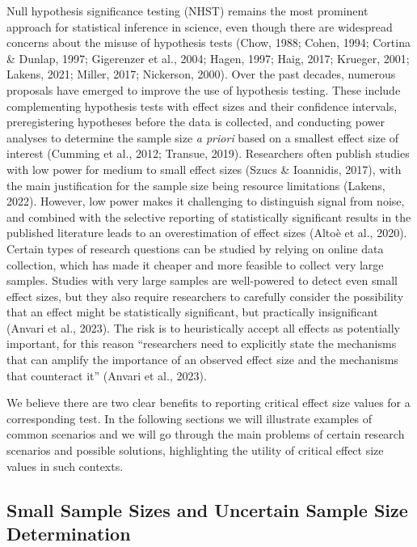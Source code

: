\documentclass[
  man,floatsintext]{apa7}
\begin{document}
Null hypothesis significance testing (NHST) remains the most prominent approach for statistical inference in science, even though there are widespread concerns about the misuse of hypothesis tests (Chow, 1988; Cohen, 1994; Cortina \& Dunlap, 1997; Gigerenzer et al., 2004; Hagen, 1997; Haig, 2017; Krueger, 2001; Lakens, 2021; Miller, 2017; Nickerson, 2000). Over the past decades, numerous proposals have emerged to improve the use of hypothesis testing. These include complementing hypothesis tests with effect sizes and their confidence intervals, preregistering hypotheses before the data is collected, and conducting power analyses to determine the sample size \textit{a priori} based on a smallest effect size of interest (Cumming et al., 2012; Transue, 2019). Researchers often publish studies with low power for medium to small effect sizes (Szucs \& Ioannidis, 2017), with the main justification for the sample size being resource limitations (Lakens, 2022). However, low power makes it challenging to distinguish signal from noise, and combined with the selective reporting of statistically significant results in the published literature leads to an overestimation of effect sizes (Altoè et al., 2020). Certain types of research questions can be studied by relying on online data collection, which has made it cheaper and more feasible to collect very large samples. Studies with very large samples are well-powered to detect even small effect sizes, but they also require researchers to carefully consider the possibility that an effect might be statistically significant, but practically insignificant (Anvari et al., 2023). The risk is to heuristically accept all effects as potentially important, for this reason ``researchers need to explicitly state the mechanisms that can amplify the importance of an observed effect size and the mechanisms that counteract it'' (Anvari et al., 2023).

We believe there are two clear benefits to reporting critical effect size values for a corresponding test. In the following sections we will illustrate examples of common scenarios and we will go through the main problems of certain research scenarios and possible solutions, highlighting the utility of critical effect size values in such contexts.

\hypertarget{small-sample-sizes-and-uncertain-sample-size-determination}{%
\subsection{Small Sample Sizes and Uncertain Sample Size Determination}\label{small-sample-sizes-and-uncertain-sample-size-determination}}
\end{document}
